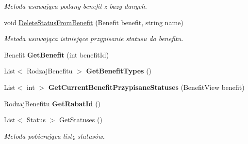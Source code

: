 \begin{DoxyCompactItemize}
\begin{DoxyCompactList}\small\item\em Metoda usuwająca podany benefit z bazy danych. \end{DoxyCompactList}\item 
void \hyperlink{class_ocena_klientow_1_1_view_model_1_1_benefit_view_model_ab5199fb111e34d97534ad2d188610b93}{Delete\+Status\+From\+Benefit} (Benefit benefit, string name)
\begin{DoxyCompactList}\small\item\em Metoda usuwająca istniejące przypisanie statusu do benefitu. \end{DoxyCompactList}\item 
\hypertarget{class_ocena_klientow_1_1_view_model_1_1_benefit_view_model_af95e425d6e9d53fb21b4f8c7f882625e}{}\label{class_ocena_klientow_1_1_view_model_1_1_benefit_view_model_af95e425d6e9d53fb21b4f8c7f882625e} 
Benefit {\bfseries Get\+Benefit} (int benefit\+Id)
\item 
\hypertarget{class_ocena_klientow_1_1_view_model_1_1_benefit_view_model_a95c1f64e592691b91f93c3acc82f0fc4}{}\label{class_ocena_klientow_1_1_view_model_1_1_benefit_view_model_a95c1f64e592691b91f93c3acc82f0fc4} 
List$<$ Rodzaj\+Benefitu $>$ {\bfseries Get\+Benefit\+Types} ()
\item 
\hypertarget{class_ocena_klientow_1_1_view_model_1_1_benefit_view_model_a85df459d3333a2821e96865f08bc86e1}{}\label{class_ocena_klientow_1_1_view_model_1_1_benefit_view_model_a85df459d3333a2821e96865f08bc86e1} 
List$<$ int $>$ {\bfseries Get\+Current\+Benefit\+Przypisane\+Statuses} (Benefit\+View benefit)
\item 
\hypertarget{class_ocena_klientow_1_1_view_model_1_1_benefit_view_model_a76395131def2dfafd898c51c11a6be3a}{}\label{class_ocena_klientow_1_1_view_model_1_1_benefit_view_model_a76395131def2dfafd898c51c11a6be3a} 
Rodzaj\+Benefitu {\bfseries Get\+Rabat\+Id} ()
\item 
List$<$ Status $>$ \hyperlink{class_ocena_klientow_1_1_view_model_1_1_benefit_view_model_aaab199bf68bdb87b910fdfe2cd45c1c6}{Get\+Statuses} ()
\begin{DoxyCompactList}\small\item\em Metoda pobierająca listę statusów. \end{DoxyCompactList}\item 
\hypertarget{class_ocena_klientow_1_1_view_model_1_1_benefit_view_model_a4d7ffaae92dc6c789239ff10188596a4}{}\label{class_ocena_klientow_1_1_view_model_1_1_benefit_view_model_a4d7ffaae92dc6c789239ff10188596a4} 

\end{DoxyCompactItemize}
